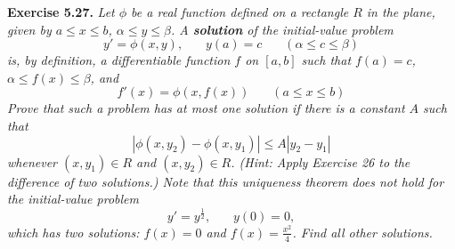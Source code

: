 \documentclass{article}
\begin{document}



\textbf{Exercise 5.27.}
\emph{Let $\phi$ be a real function defined on a rectangle $R$ in the plane,
given by $a \leq x \leq b$, $\alpha \leq y \leq \beta$.
A \textbf{solution} of the initial-value problem
\[
  y' = \phi(x,y), \:\:\:\:\:\:\:\: y(a) = c \:\:\:\:\:\:\:\: (\alpha \leq c \leq \beta)
\]
is, by definition, a differentiable function $f$ on $[a,b]$ such that
$f(a) = c$, $\alpha \leq f(x) \leq \beta$, and
\[
  f'(x) = \phi(x,f(x)) \:\:\:\:\:\:\:\: (a \leq x \leq b)
\]
Prove that such a problem has at most one solution if there is a constant $A$ such that
\[
  |\phi(x,y_2) - \phi(x,y_1)| \leq A|y_2 - y_1|
\]
whenever $(x,y_1) \in R$ and $(x,y_2) \in R$.
(Hint: Apply Exercise 26 to the difference of two solutions.)
Note that this uniqueness theorem does not hold for the initial-value problem
\[
  y' = y^{\frac{1}{2}}, \:\:\:\:\:\:\:\: y(0) = 0,
\]
which has two solutions: $f(x) = 0$ and $f(x) = \frac{x^2}{4}$.
Find all other solutions.} \\
\end{document}
